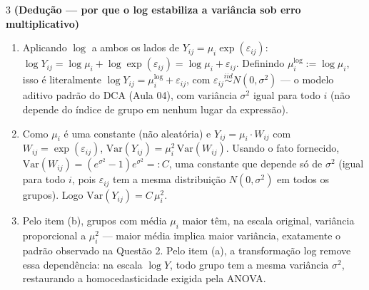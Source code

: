 \documentclass[11pt]{article}
\begin{document}
\begin{questao}{3} \textbf{(Dedução --- por que o log estabiliza a variância sob erro multiplicativo)}
\end{questao}
\begin{solucao}
\begin{enumerate}[label=(\alph*)]
  \item Aplicando $\log$ a ambos os lados de $Y_{ij}=\mu_i\exp(\varepsilon_{ij})$:
    $\log Y_{ij} = \log\mu_i + \log\exp(\varepsilon_{ij}) = \log\mu_i + \varepsilon_{ij}$.
    Definindo $\mu_i^{\log} := \log\mu_i$, isso é literalmente $\log Y_{ij} = \mu_i^{\log} +
    \varepsilon_{ij}$, com $\varepsilon_{ij}\overset{iid}{\sim}N(0,\sigma^2)$ --- o modelo aditivo
    padrão do DCA (Aula 04), com variância $\sigma^2$ igual para todo $i$ (não depende do índice
    de grupo em nenhum lugar da expressão).
  \item Como $\mu_i$ é uma constante (não aleatória) e $Y_{ij}=\mu_i\cdot W_{ij}$ com
    $W_{ij}=\exp(\varepsilon_{ij})$, $\mathrm{Var}(Y_{ij}) = \mu_i^2\,\mathrm{Var}(W_{ij})$.
    Usando o fato fornecido, $\mathrm{Var}(W_{ij}) = (e^{\sigma^2}-1)e^{\sigma^2} =: C$, uma
    constante que depende só de $\sigma^2$ (igual para todo $i$, pois $\varepsilon_{ij}$ tem a
    mesma distribuição $N(0,\sigma^2)$ em todos os grupos). Logo $\mathrm{Var}(Y_{ij}) = C\,\mu_i^2$.
  \item Pelo item (b), grupos com média $\mu_i$ maior têm, na escala original, variância
    proporcional a $\mu_i^2$ --- maior média implica maior variância, exatamente o padrão
    observado na Questão 2. Pelo item (a), a transformação log remove essa dependência: na escala
    $\log Y$, todo grupo tem a mesma variância $\sigma^2$, restaurando a homocedasticidade exigida
    pela ANOVA.
\end{enumerate}
\end{solucao}
\end{document}
